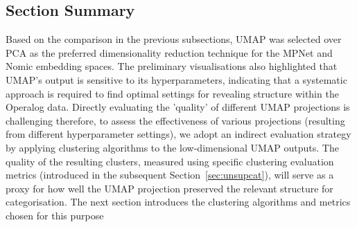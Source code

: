 \documentclass[10pt,oneside]{report}
\begin{document}
\subsection{Section Summary}

Based on the comparison in the previous subsections, UMAP was selected over PCA as the preferred dimensionality reduction technique for the MPNet and Nomic embedding spaces. The preliminary visualisations also highlighted that UMAP's output is sensitive to its hyperparameters, indicating that a systematic approach is required to find optimal settings for revealing structure within the Operalog data. Directly evaluating the 'quality' of different UMAP projections is challenging therefore, to assess the effectiveness of various projections (resulting from different hyperparameter settings), we adopt an indirect evaluation strategy by applying clustering algorithms to the low-dimensional UMAP outputs. The quality of the resulting clusters, measured using specific clustering evaluation metrics (introduced in the subsequent Section~\ref{sec:unsupcat}), will serve as a proxy for how well the UMAP projection preserved the relevant structure for categorisation. The next section introduces the clustering algorithms and metrics chosen for this purpose

\end{document}
